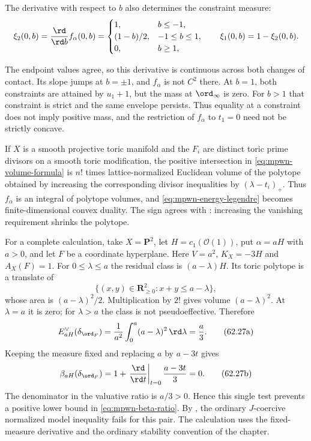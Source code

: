 \begin{example}
\par\noindent\begin{minipage}{\linewidth}
The derivative with respect to $b$ also determines the constraint measure:
\[
 \xi_2(0,b)=\frac{\rd}{\rd b}f_\alpha(0,b)
 =\begin{cases}
 1,&b\leq-1,\\
 (1-b)/2,&-1\leq b\leq1,\\
 0,&b\geq1,
 \end{cases}
 \qquad \xi_1(0,b)=1-\xi_2(0,b).
\]
\end{minipage}\par
The endpoint values agree, so this derivative is continuous across both changes of contact. Its slope jumps at $b=\pm1$, and $f_\alpha$ is not $C^2$ there. At $b=1$, both constraints are attained by $u_1+1$, but the mass at $\ord_\infty$ is zero. For $b>1$ that constraint is strict and the same envelope persists. Thus equality at a constraint does not imply positive mass, and the restriction of $f_\alpha$ to $t_1=0$ need not be strictly concave.
\end{example}

\begin{example}
\label{ex:mpwn-toric-beta}
If $X$ is a smooth projective toric manifold and the $F_i$ are
distinct toric prime divisors on a smooth toric modification,
the positive intersection in \eqref{eq:mpwn-volume-formula} is
$n!$ times lattice-normalized Euclidean volume of the polytope
obtained by increasing the corresponding divisor inequalities
by $(\lambda-t_i)_+$. Thus $f_\alpha$ is an integral of polytope
volumes, and \eqref{eq:mpwn-energy-legendre} becomes finite-dimensional
convex duality. The sign agrees with
: increasing the vanishing
requirement shrinks the polytope.

For a complete calculation, take $X=\mathbf P^2$, let
$H=c_1(\mathcal O(1))$, put $\alpha=aH$ with $a>0$, and let
$F$ be a coordinate hyperplane. Here $V=a^2$, $K_X=-3H$
and $A_X(F)=1$. For $0\leq\lambda\leq a$ the residual
class is $(a-\lambda)H$. Its toric polytope is a translate of
\[
 \{(x,y)\in\mathbf R_{\geq0}^2:x+y\leq a-\lambda\},
\]
whose area is $(a-\lambda)^2/2$. Multiplication by $2!$
gives volume $(a-\lambda)^2$. At $\lambda=a$ it is zero;
for $\lambda>a$ the class is not pseudoeffective. Therefore
\[
 E_{aH}^\vee(\delta_{\ord_F})
       =\frac1{a^2}\int_0^a(a-\lambda)^2\,\rd\lambda
       =\frac a3.
\tag{62.27a}\label{eq:mpwn-toric-hyperplane-energy}
\]
Keeping the measure fixed and replacing $a$ by $a-3t$ gives
\[
 \beta_{aH}(\delta_{\ord_F})
      =1+\left.\frac{\rd}{\rd t}\right|_{t=0}\frac{a-3t}{3}
      =0.
\tag{62.27b}\label{eq:mpwn-toric-hyperplane-beta}
\]
The denominator in the valuative ratio is $a/3>0$.
Hence this single test prevents a positive lower bound in
\eqref{eq:mpwn-beta-ratio}. By ,
the ordinary $J$-coercive normalized model inequality fails
for this pair. The calculation uses the fixed-measure derivative
and the ordinary stability convention of the chapter.
\end{example}

